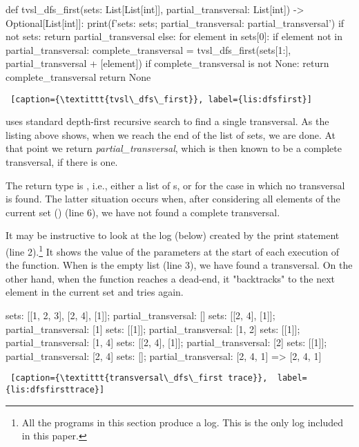 \begin{minipage}{\linewidth} \largev   \hrulefill
\begin{python}[numbers=left]
def tvsl_dfs_first(sets: List[List[int]], partial_transversal: List[int]) -> Optional[List[int]]:
  print(f'sets: {sets}; partial_transversal: {partial_transversal}')  
  if not sets:
    return partial_transversal
  else:
    for element in sets[0]:
      if element not in partial_transversal:
        complete_transversal = tvsl_dfs_first(sets[1:], partial_transversal + [element])
        if complete_transversal is not None:
          return complete_transversal 
    return None
\end{python}
\begin{lstlisting} [caption={\textittt{tvsl\_dfs\_first}}, label={lis:dfsfirst}]
\end{lstlisting}
\end{minipage}

\smallv

 uses standard depth-first recursive search to find a single transversal. As the listing above shows, when we reach the end of the list of sets, we are done. At that point we return  \textit{partial\_transversal}, which is then known to be a complete transversal, if there is one. 

The return type is , i.e., either a list of s, or  for the case in which no transversal is found. The latter situation occurs when, after considering all elements of the current set () (line 6), we have not found a complete transversal.  

It may be instructive to look at the log (below) created by the print statement (line 2).\footnote{All the programs in this section produce a log. This is the only log included in this paper.} It shows the value of the parameters at the start of each execution of the function. When  is the empty list (line 3), we have found a transversal. On the other hand, when the function reaches a dead-end, it "backtracks" to the next element in the current set and tries again. 
\smallv
\smallv
\smallv

\begin{minipage}{\linewidth}  \largev   \hrulefill
\begin{python}[numbers=left]
sets: [[1, 2, 3], [2, 4], [1]]; partial_transversal: []
sets: [[2, 4], [1]]; partial_transversal: [1]
sets: [[1]]; partial_transversal: [1, 2]
sets: [[1]]; partial_transversal: [1, 4]
sets: [[2, 4], [1]]; partial_transversal: [2]
sets: [[1]]; partial_transversal: [2, 4]
sets: []; partial_transversal: [2, 4, 1]
                                =>  [2, 4, 1]
\end{python}
\begin{lstlisting} [caption={\textittt{transversal\_dfs\_first trace}},  label={lis:dfsfirsttrace}]
\end{lstlisting}
\end{minipage}

